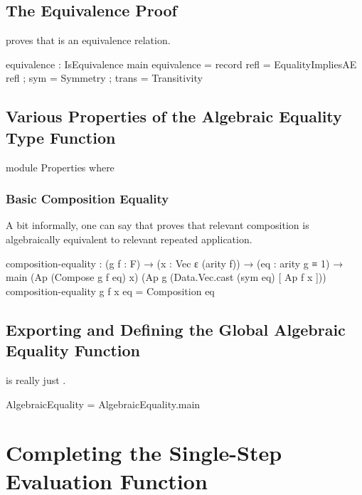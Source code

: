 \documentclass{report}
\begin{document}
\subsection{The Equivalence Proof}
 proves that  is an equivalence relation.

\begin{code}
    equivalence : IsEquivalence main
    equivalence = record
      { refl = EqualityImpliesAE refl
      ; sym = Symmetry
      ; trans = Transitivity
      }
\end{code}

\subsection{Various Properties of the Algebraic Equality Type Function}

\begin{code}
    module Properties where
\end{code}

\subsubsection{Basic Composition Equality}
A bit informally, one can say that  proves that relevant composition is algebraically equivalent to relevant repeated application.

\begin{code}
      composition-equality :
        (g f : F) →
        (x : Vec ε (arity f)) →
        (eq : arity g ≡ 1) →
        main (Ap (Compose g f eq) x)
             (Ap g (Data.Vec.cast (sym eq) [ Ap f x ]))
      composition-equality g f x eq = Composition eq
\end{code}

\subsection{Exporting and Defining the Global Algebraic Equality Function}
 is really just .

\begin{code}
  AlgebraicEquality = AlgebraicEquality.main
\end{code}

\section{Completing the Single-Step Evaluation Function}
\end{document}

